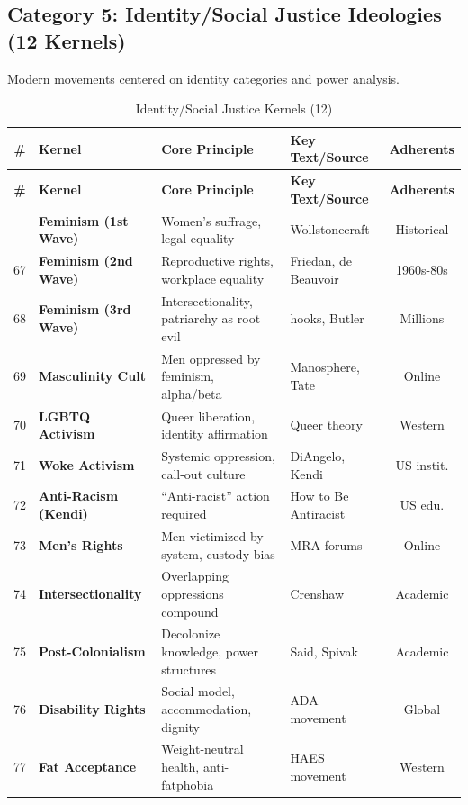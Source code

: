\documentclass[11pt,a4paper]{article}
\theoremstyle{definition}
\theoremstyle{remark}
\begin{document}
\subsection{Category 5: Identity/Social Justice Ideologies (12 Kernels)}

Modern movements centered on identity categories and power analysis.

\begin{longtable}{@{}clp{4cm}p{3.5cm}c@{}}
\caption{Identity/Social Justice Kernels (12)} \label{tab:identity-kernels} \\
\toprule
\textbf{\#} & \textbf{Kernel} & \textbf{Core Principle} & \textbf{Key Text/Source} & \textbf{Adherents} \\
\midrule
\endfirsthead
\toprule
\textbf{\#} & \textbf{Kernel} & \textbf{Core Principle} & \textbf{Key Text/Source} & \textbf{Adherents} \\
\midrule
\endhead
\bottomrule
\endlastfoot
66 & \textbf{Feminism (1st Wave)} & Women's suffrage, legal equality & Wollstonecraft & Historical \\
67 & \textbf{Feminism (2nd Wave)} & Reproductive rights, workplace equality & Friedan, de Beauvoir & 1960s-80s \\
68 & \textbf{Feminism (3rd Wave)} & Intersectionality, patriarchy as root evil & hooks, Butler & Millions \\
69 & \textbf{Masculinity Cult} & Men oppressed by feminism, alpha/beta & Manosphere, Tate & Online \\
70 & \textbf{LGBTQ Activism} & Queer liberation, identity affirmation & Queer theory & Western \\
71 & \textbf{Woke Activism} & Systemic oppression, call-out culture & DiAngelo, Kendi & US instit. \\
72 & \textbf{Anti-Racism (Kendi)} & ``Anti-racist'' action required & How to Be Antiracist & US edu. \\
73 & \textbf{Men's Rights} & Men victimized by system, custody bias & MRA forums & Online \\
74 & \textbf{Intersectionality} & Overlapping oppressions compound & Crenshaw & Academic \\
75 & \textbf{Post-Colonialism} & Decolonize knowledge, power structures & Said, Spivak & Academic \\
76 & \textbf{Disability Rights} & Social model, accommodation, dignity & ADA movement & Global \\
77 & \textbf{Fat Acceptance} & Weight-neutral health, anti-fatphobia & HAES movement & Western \\
\end{longtable}
\end{document}
